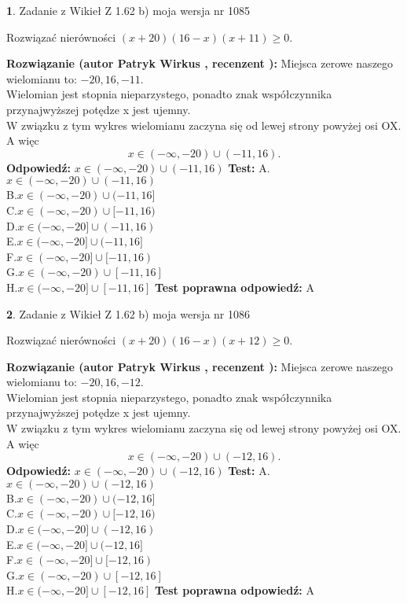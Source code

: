 \documentclass[12pt, a4paper]{article}
\theoremstyle{definition} %
\newtheorem{zad}{}
\newcommand{\zadStart}[1]{\begin{zad}#1\newline}
\newcommand{\zadStop}{\end{zad}}
\newcommand{\rozwStart}[2]{\noindent \textbf{Rozwiązanie (autor #1 , recenzent #2): }\newline}
\newcommand{\rozwStop}{\newline}
\newcommand{\odpStart}{\noindent \textbf{Odpowiedź:}\newline}
\newcommand{\odpStop}{\newline}
\newcommand{\testStart}{\noindent \textbf{Test:}\newline}
\newcommand{\testStop}{\newline}
\newcommand{\kluczStart}{\noindent \textbf{Test poprawna odpowiedź:}\newline}
\newcommand{\kluczStop}{\newline}
\begin{document}
\zadStart{Zadanie z Wikieł Z 1.62 b) moja wersja nr 1085}

Rozwiązać nierówności $(x+20)(16-x)(x+11)\ge0$.
\zadStop
\rozwStart{Patryk Wirkus}{}
Miejsca zerowe naszego wielomianu to: $-20, 16, -11$.\\
Wielomian jest stopnia nieparzystego, ponadto znak współczynnika przy\linebreak najwyższej potędze x jest ujemny.\\ W związku z tym wykres wielomianu zaczyna się od lewej strony powyżej osi OX. A więc $$x \in (-\infty,-20) \cup (-11,16).$$
\rozwStop
\odpStart
$x \in (-\infty,-20) \cup (-11,16)$
\odpStop
\testStart
A.$x \in (-\infty,-20) \cup (-11,16)$\\
B.$x \in (-\infty,-20) \cup (-11,16]$\\
C.$x \in (-\infty,-20) \cup [-11,16)$\\
D.$x \in (-\infty,-20] \cup (-11,16)$\\
E.$x \in (-\infty,-20] \cup (-11,16]$\\
F.$x \in (-\infty,-20] \cup [-11,16)$\\
G.$x \in (-\infty,-20) \cup [-11,16]$\\
H.$x \in (-\infty,-20] \cup [-11,16]$
\testStop
\kluczStart
A
\kluczStop



\zadStart{Zadanie z Wikieł Z 1.62 b) moja wersja nr 1086}

Rozwiązać nierówności $(x+20)(16-x)(x+12)\ge0$.
\zadStop
\rozwStart{Patryk Wirkus}{}
Miejsca zerowe naszego wielomianu to: $-20, 16, -12$.\\
Wielomian jest stopnia nieparzystego, ponadto znak współczynnika przy\linebreak najwyższej potędze x jest ujemny.\\ W związku z tym wykres wielomianu zaczyna się od lewej strony powyżej osi OX. A więc $$x \in (-\infty,-20) \cup (-12,16).$$
\rozwStop
\odpStart
$x \in (-\infty,-20) \cup (-12,16)$
\odpStop
\testStart
A.$x \in (-\infty,-20) \cup (-12,16)$\\
B.$x \in (-\infty,-20) \cup (-12,16]$\\
C.$x \in (-\infty,-20) \cup [-12,16)$\\
D.$x \in (-\infty,-20] \cup (-12,16)$\\
E.$x \in (-\infty,-20] \cup (-12,16]$\\
F.$x \in (-\infty,-20] \cup [-12,16)$\\
G.$x \in (-\infty,-20) \cup [-12,16]$\\
H.$x \in (-\infty,-20] \cup [-12,16]$
\testStop
\kluczStart
A
\kluczStop
\end{document}
